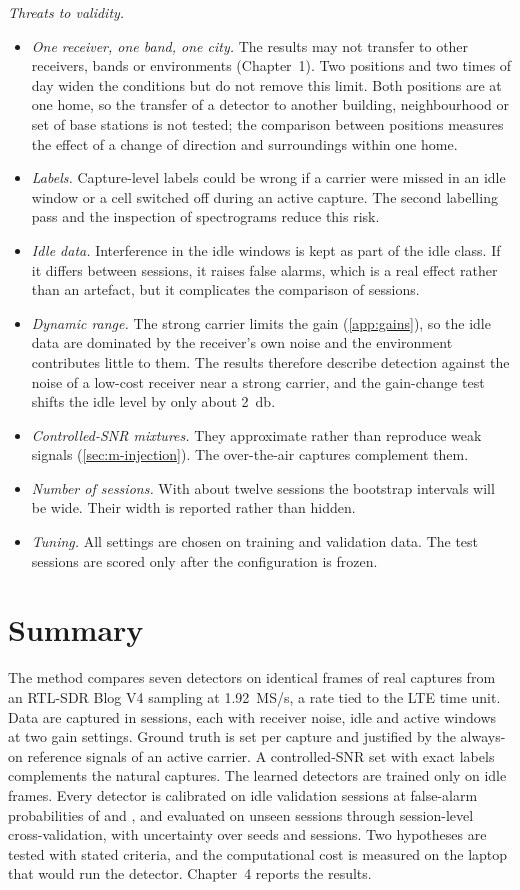 \emph{Threats to validity.}
\begin{itemize}
  \item \emph{One receiver, one band, one city.} The results may not transfer to other receivers, bands or environments (Chapter~1). Two positions and two times of day widen the conditions but do not remove this limit. Both positions are at one home, so the transfer of a detector to another building, neighbourhood or set of base stations is not tested; the comparison between positions measures the effect of a change of direction and surroundings within one home.
  \item \emph{Labels.} Capture-level labels could be wrong if a carrier were missed in an idle window or a cell switched off during an active capture. The second labelling pass and the inspection of spectrograms reduce this risk.
  \item \emph{Idle data.} Interference in the idle windows is kept as part of the idle class. If it differs between sessions, it raises false alarms, which is a real effect rather than an artefact, but it complicates the comparison of sessions.
  \item \emph{Dynamic range.} The strong carrier limits the gain (\cref{app:gains}), so the idle data are dominated by the receiver's own noise and the environment contributes little to them. The results therefore describe detection against the noise of a low-cost receiver near a strong carrier, and the gain-change test shifts the idle level by only about \qty{2}{\decibel}.
  \item \emph{Controlled-SNR mixtures.} They approximate rather than reproduce weak signals (\cref{sec:m-injection}). The over-the-air captures complement them.
  \item \emph{Number of sessions.} With about twelve sessions the bootstrap intervals will be wide. Their width is reported rather than hidden.
  \item \emph{Tuning.} All settings are chosen on training and validation data. The test sessions are scored only after the configuration is frozen.
\end{itemize}

\section{Summary}
\label{sec:m-summary}

The method compares seven detectors on identical frames of real captures from an RTL-SDR Blog V4 sampling at \qty{1.92}{MS/s}, a rate tied to the LTE time unit. Data are captured in sessions, each with receiver noise, idle and active windows at two gain settings. Ground truth is set per capture and justified by the always-on reference signals of an active carrier. A controlled-SNR set with exact labels complements the natural captures. The learned detectors are trained only on idle frames. Every detector is calibrated on idle validation sessions at false-alarm probabilities of  and , and evaluated on unseen sessions through session-level cross-validation, with uncertainty over seeds and sessions. Two hypotheses are tested with stated criteria, and the computational cost is measured on the laptop that would run the detector. Chapter~4 reports the results.
